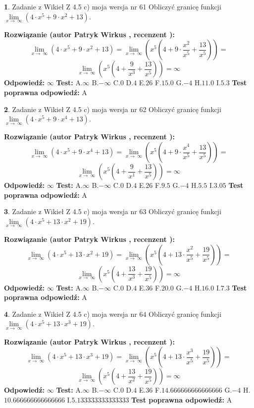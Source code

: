 \documentclass[12pt, a4paper]{article}
\theoremstyle{definition} %
\newtheorem{zad}{}
\newcommand{\zadStart}[1]{\begin{zad}#1\newline}
\newcommand{\zadStop}{\end{zad}}
\newcommand{\rozwStart}[2]{\noindent \textbf{Rozwiązanie (autor #1 , recenzent #2): }\newline}
\newcommand{\rozwStop}{\newline}
\newcommand{\odpStart}{\noindent \textbf{Odpowiedź:}\newline}
\newcommand{\odpStop}{\newline}
\newcommand{\testStart}{\noindent \textbf{Test:}\newline}
\newcommand{\testStop}{\newline}
\newcommand{\kluczStart}{\noindent \textbf{Test poprawna odpowiedź:}\newline}
\newcommand{\kluczStop}{\newline}
\begin{document}
\zadStart{Zadanie z Wikieł Z 4.5 c) moja wersja nr 61}
Obliczyć granicę funkcji  $\lim\limits_{x\to\ \infty}(4 \cdot x^{5}+9 \cdot x^{2}+13)$.
\zadStop
\rozwStart{Patryk Wirkus}{}
$$\lim\limits_{x\to\ \infty}(4 \cdot x^{5}+9 \cdot x^{2}+13) = \lim\limits_{x\to\ \infty}(x^{5}(4 +9 \cdot \frac{x^{2}}{x^{5}}+\frac{13}{x^{5}})) =$$ $$\lim\limits_{x\to\ \infty}(x^{5}(4 +\frac{9}{x^{3}}+\frac{13}{x^{5}})) =\infty$$
\rozwStop
\odpStart
$\infty$
\odpStop
\testStart
A.$\infty$ B.$-\infty$ C.$0$ D.$4$ E.$26$
F.$15.0$ G.$-4$
H.$11.0$
I.$5.3$
\testStop
\kluczStart
A
\kluczStop



\zadStart{Zadanie z Wikieł Z 4.5 c) moja wersja nr 62}
Obliczyć granicę funkcji  $\lim\limits_{x\to\ \infty}(4 \cdot x^{5}+9 \cdot x^{4}+13)$.
\zadStop
\rozwStart{Patryk Wirkus}{}
$$\lim\limits_{x\to\ \infty}(4 \cdot x^{5}+9 \cdot x^{4}+13) = \lim\limits_{x\to\ \infty}(x^{5}(4 +9 \cdot \frac{x^{4}}{x^{5}}+\frac{13}{x^{5}})) =$$ $$\lim\limits_{x\to\ \infty}(x^{5}(4 +\frac{9}{x^{1}}+\frac{13}{x^{5}})) =\infty$$
\rozwStop
\odpStart
$\infty$
\odpStop
\testStart
A.$\infty$ B.$-\infty$ C.$0$ D.$4$ E.$26$
F.$9.5$ G.$-4$
H.$5.5$
I.$3.05$
\testStop
\kluczStart
A
\kluczStop



\zadStart{Zadanie z Wikieł Z 4.5 c) moja wersja nr 63}
Obliczyć granicę funkcji  $\lim\limits_{x\to\ \infty}(4 \cdot x^{5}+13 \cdot x^{2}+19)$.
\zadStop
\rozwStart{Patryk Wirkus}{}
$$\lim\limits_{x\to\ \infty}(4 \cdot x^{5}+13 \cdot x^{2}+19) = \lim\limits_{x\to\ \infty}(x^{5}(4 +13 \cdot \frac{x^{2}}{x^{5}}+\frac{19}{x^{5}})) =$$ $$\lim\limits_{x\to\ \infty}(x^{5}(4 +\frac{13}{x^{3}}+\frac{19}{x^{5}})) =\infty$$
\rozwStop
\odpStart
$\infty$
\odpStop
\testStart
A.$\infty$ B.$-\infty$ C.$0$ D.$4$ E.$36$
F.$20.0$ G.$-4$
H.$16.0$
I.$7.3$
\testStop
\kluczStart
A
\kluczStop



\zadStart{Zadanie z Wikieł Z 4.5 c) moja wersja nr 64}
Obliczyć granicę funkcji  $\lim\limits_{x\to\ \infty}(4 \cdot x^{5}+13 \cdot x^{3}+19)$.
\zadStop
\rozwStart{Patryk Wirkus}{}
$$\lim\limits_{x\to\ \infty}(4 \cdot x^{5}+13 \cdot x^{3}+19) = \lim\limits_{x\to\ \infty}(x^{5}(4 +13 \cdot \frac{x^{3}}{x^{5}}+\frac{19}{x^{5}})) =$$ $$\lim\limits_{x\to\ \infty}(x^{5}(4 +\frac{13}{x^{2}}+\frac{19}{x^{5}})) =\infty$$
\rozwStop
\odpStart
$\infty$
\odpStop
\testStart
A.$\infty$ B.$-\infty$ C.$0$ D.$4$ E.$36$
F.$14.666666666666666$ G.$-4$
H.$10.666666666666666$
I.$5.133333333333333$
\testStop
\kluczStart
A
\kluczStop
\end{document}
